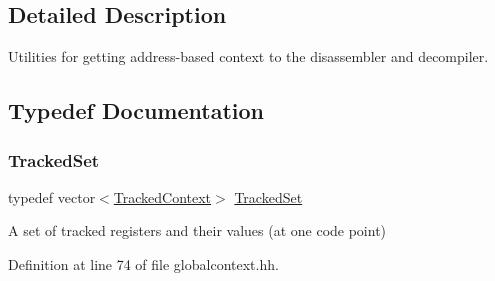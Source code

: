 \subsection{Detailed Description}
Utilities for getting address-\/based context to the disassembler and decompiler. 



\subsection{Typedef Documentation}
\mbox{\label{globalcontext_8hh_a7559d2c55c5d12fbbaf0418733b62438}} 
\subsubsection{\texorpdfstring{TrackedSet}{TrackedSet}}
{\footnotesize\ttfamily typedef vector$<$\mbox{\hyperlink{struct_tracked_context}{Tracked\+Context}}$>$ \mbox{\hyperlink{globalcontext_8hh_a7559d2c55c5d12fbbaf0418733b62438}{Tracked\+Set}}}



A set of tracked registers and their values (at one code point) 



Definition at line 74 of file globalcontext.\+hh.

